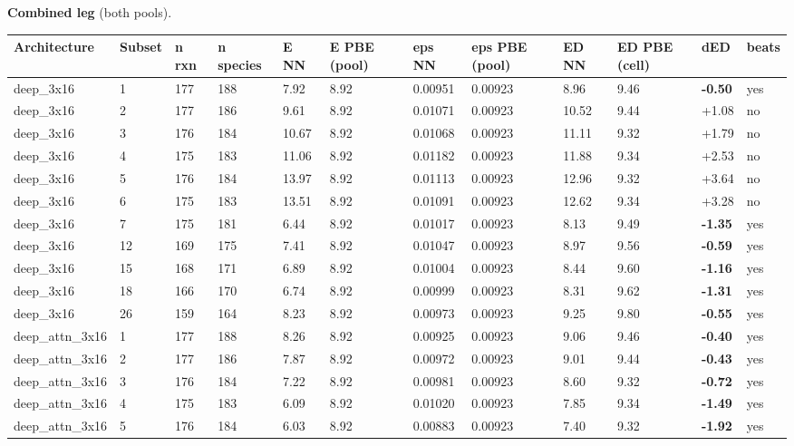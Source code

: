 \documentclass[10pt,a4paper]{article}
\begin{document}
\begin{landscape}
\textbf{Combined leg} (both pools).

\begin{footnotesize}
\begin{longtable}{llllllllllll}
\toprule Architecture & Subset & n rxn & n species & E NN & E PBE (pool) & eps NN & eps PBE (pool) & ED NN & ED PBE (cell) & dED & beats \\ \midrule \endhead
deep\_3x16 & 1 & 177 & 188 & 7.92 & 8.92 & 0.00951 & 0.00923 & 8.96 & 9.46 & \textbf{-0.50} & yes \\
deep\_3x16 & 2 & 177 & 186 & 9.61 & 8.92 & 0.01071 & 0.00923 & 10.52 & 9.44 & +1.08 & no \\
deep\_3x16 & 3 & 176 & 184 & 10.67 & 8.92 & 0.01068 & 0.00923 & 11.11 & 9.32 & +1.79 & no \\
deep\_3x16 & 4 & 175 & 183 & 11.06 & 8.92 & 0.01182 & 0.00923 & 11.88 & 9.34 & +2.53 & no \\
deep\_3x16 & 5 & 176 & 184 & 13.97 & 8.92 & 0.01113 & 0.00923 & 12.96 & 9.32 & +3.64 & no \\
deep\_3x16 & 6 & 175 & 183 & 13.51 & 8.92 & 0.01091 & 0.00923 & 12.62 & 9.34 & +3.28 & no \\
deep\_3x16 & 7 & 175 & 181 & 6.44 & 8.92 & 0.01017 & 0.00923 & 8.13 & 9.49 & \textbf{-1.35} & yes \\
deep\_3x16 & 12 & 169 & 175 & 7.41 & 8.92 & 0.01047 & 0.00923 & 8.97 & 9.56 & \textbf{-0.59} & yes \\
deep\_3x16 & 15 & 168 & 171 & 6.89 & 8.92 & 0.01004 & 0.00923 & 8.44 & 9.60 & \textbf{-1.16} & yes \\
deep\_3x16 & 18 & 166 & 170 & 6.74 & 8.92 & 0.00999 & 0.00923 & 8.31 & 9.62 & \textbf{-1.31} & yes \\
deep\_3x16 & 26 & 159 & 164 & 8.23 & 8.92 & 0.00973 & 0.00923 & 9.25 & 9.80 & \textbf{-0.55} & yes \\
deep\_attn\_3x16 & 1 & 177 & 188 & 8.26 & 8.92 & 0.00925 & 0.00923 & 9.06 & 9.46 & \textbf{-0.40} & yes \\
deep\_attn\_3x16 & 2 & 177 & 186 & 7.87 & 8.92 & 0.00972 & 0.00923 & 9.01 & 9.44 & \textbf{-0.43} & yes \\
deep\_attn\_3x16 & 3 & 176 & 184 & 7.22 & 8.92 & 0.00981 & 0.00923 & 8.60 & 9.32 & \textbf{-0.72} & yes \\
deep\_attn\_3x16 & 4 & 175 & 183 & 6.09 & 8.92 & 0.01020 & 0.00923 & 7.85 & 9.34 & \textbf{-1.49} & yes \\
deep\_attn\_3x16 & 5 & 176 & 184 & 6.03 & 8.92 & 0.00883 & 0.00923 & 7.40 & 9.32 & \textbf{-1.92} & yes \\

\end{longtable}
\end{footnotesize}
\end{landscape}
\end{document}
